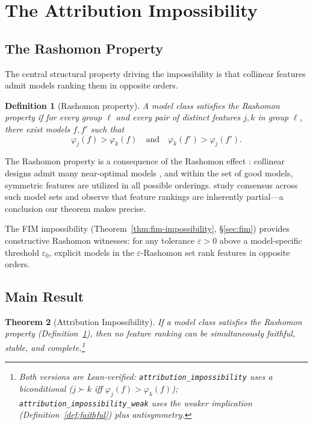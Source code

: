 \documentclass{article}
\newtheorem{theorem}{Theorem}
\newtheorem{definition}[theorem]{Definition}
\begin{document}

\section{The Attribution Impossibility}
\label{sec:impossibility}

\subsection{The Rashomon Property}
\label{sec:rashomon}

The central structural property driving the impossibility is that collinear features admit models ranking them in opposite orders.

\begin{definition}[Rashomon property]
\label{def:rashomon}
A model class satisfies the \emph{Rashomon property} if for every group $\ell$ and every pair of distinct features $j, k$ in group $\ell$, there exist models $f, f'$ such that
\[
    \varphi_j(f) > \varphi_k(f) \quad \text{and} \quad \varphi_k(f') > \varphi_j(f').
\]
\end{definition}

\begin{sloppypar}
The Rashomon property is a consequence of the Rashomon effect
\citep{rudin2024amazing,fisher2019models}: collinear designs admit many near-optimal
models \citep{damour2022underspecification}, and within the set of good models,
symmetric features are utilized in all possible orderings.
\citet{laberge2023partial} study consensus across such model sets and observe that
feature rankings are inherently partial---a conclusion our theorem makes precise.
\end{sloppypar}

The FIM impossibility (Theorem~\ref{thm:fim-impossibility}, \S\ref{sec:fim}) provides constructive Rashomon witnesses: for any tolerance $\varepsilon > 0$ above a model-specific threshold $\varepsilon_0$, explicit models in the $\varepsilon$-Rashomon set rank features in opposite orders.

\subsection{Main Result}
\label{sec:main-result}

\begin{theorem}[Attribution Impossibility]
\label{thm:impossibility}
If a model class satisfies the Rashomon property (Definition~\ref{def:rashomon}),
then no feature ranking can be simultaneously faithful, stable, and
complete.\footnote{Both versions are Lean-verified:
\texttt{attribution\allowbreak\_impossibility} uses a biconditional
($j \succ k$ iff $\varphi_j(f) > \varphi_k(f)$);
\texttt{attribution\allowbreak\_impossibility\allowbreak\_weak} uses the weaker
implication (Definition~\ref{def:faithful}) plus antisymmetry.}
\end{theorem}
\end{document}
